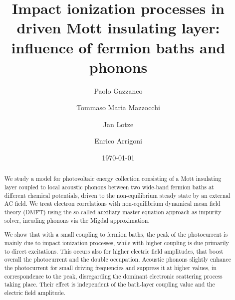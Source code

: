\documentclass[aps,prb,groupedaddress,showpacs,twocolumn,superscriptaddress,10pt]{revtex4-2}
\begin{document}
\title{Impact ionization processes in driven Mott insulating layer: influence of fermion baths and phonons}

\author{Paolo Gazzaneo}
\author{Tommaso Maria Mazzocchi}
\author{Jan Lotze}
\author{Enrico Arrigoni}

\date{\today}
 
\begin{abstract}   

We study a model for photovoltaic energy collection consisting of a Mott insulating layer coupled to local acoustic phonons between two wide-band fermion baths at different chemical potentials, driven to the non-equilibrium steady state by an external AC field. We treat electron correlations with non-equilibrium dynamical mean field theory (DMFT) using the so-called auxiliary master equation approach as impurity solver, incuding phonons via the Migdal approximation. 
 
We show that with a small coupling to fermion baths, the peak of the photocurrent is mainly due to impact ionization processes, while with higher coupling is due primarily to direct excitations. This occurs also for higher electric field amplitudes, that boost overall the photocurrent and the double occupation. Acoustic phonons slightly enhance the photocurrent for small driving frequencies and suppress it at higher values, in correspondence to the peak, disregarding the dominant electronic scattering process taking place. Their effect is independent of the bath-layer coupling value and the electric field amplitude.  
  
\end{abstract}

       
\end{document}
